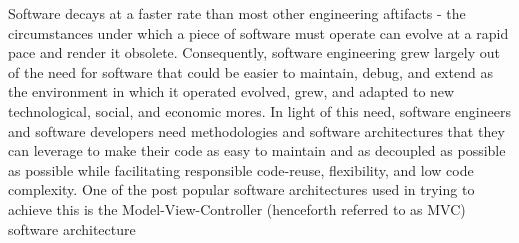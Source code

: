 Software decays at a faster rate than most other engineering aftifacts - the circumstances under which a piece of software must operate can evolve at a rapid pace and render it obsolete. Consequently, software engineering grew largely out of the need for software that could be easier to maintain, debug, and extend as the environment in which it operated evolved, grew, and adapted to new technological, social, and economic mores. In light of this need, software engineers and software developers need methodologies and software architectures that they can leverage to make their code as easy to maintain and as decoupled as possible as possible while facilitating responsible code-reuse, flexibility, and low code complexity. One of the post popular software architectures used in trying to achieve this is the Model-View-Controller (henceforth referred to as MVC) software architecture
